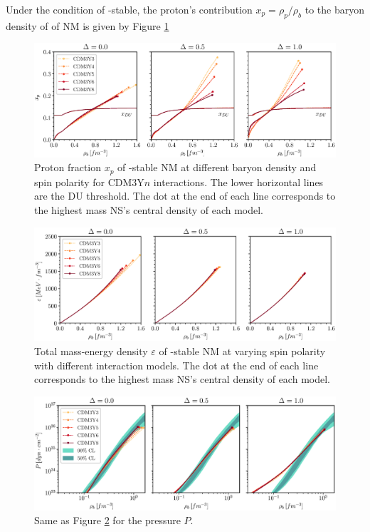 Under the condition of \textbeta-stable, the proton's contribution $x_p = \rho_p/\rho_b$ to the baryon density of of \gls{NM} is given by Figure \ref{fig:xp}
\begin{figure}[ht!]
        \centering
        \includegraphics[width=\textwidth]{fig/xp.eps}
        \caption{Proton fraction $x_p$ of \textbeta-stable \gls{NM} at different baryon density and spin polarity for CDM3Y$n$ interactions. The lower horizontal lines are the \gls{DU} threshold. The dot at the end of each line corresponds to the highest mass \gls{NS}'s central density of each model.}
        \label{fig:xp}
\end{figure} 
\begin{figure}[ht!]
        \centering
        \includegraphics[width=\textwidth]{fig/E.eps}
        \caption{Total mass-energy density $\varepsilon$ of \textbeta-stable \gls{NM} at varying spin polarity with different interaction models. The dot at the end of each line corresponds to the highest mass \gls{NS}'s central density of each model.}
        \label{fig:e}
\end{figure} 
\begin{figure}[ht!]
        \centering
        \includegraphics[width=\textwidth]{fig/P.eps}
        \caption{Same as Figure \ref{fig:e} for the pressure $P$.}
        \label{fig:p}
\end{figure} 
